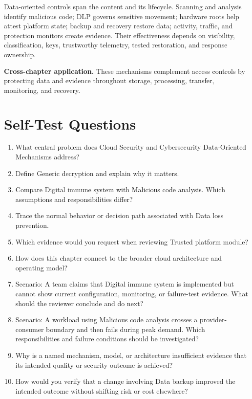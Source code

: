\documentclass[11pt]{article}
\begin{document}
\begin{synthesisbox}
Data-oriented controls span the content and its lifecycle. Scanning and analysis identify malicious code; DLP governs sensitive movement; hardware roots help attest platform state; backup and recovery restore data; activity, traffic, and protection monitors create evidence. Their effectiveness depends on visibility, classification, keys, trustworthy telemetry, tested restoration, and response ownership.
\par\smallskip
\textbf{Cross-chapter application.} These mechanisms complement access controls by protecting data and evidence throughout storage, processing, transfer, monitoring, and recovery.
\end{synthesisbox}
\section{Self-Test Questions}
\begin{enumerate}
\item What central problem does Cloud Security and Cybersecurity Data-Oriented Mechanisms address?
\item Define Generic decryption and explain why it matters.
\item Compare Digital immune system with Malicious code analysis. Which assumptions and responsibilities differ?
\item Trace the normal behavior or decision path associated with Data loss prevention.
\item Which evidence would you request when reviewing Trusted platform module?
\item How does this chapter connect to the broader cloud architecture and operating model?
\item Scenario: A team claims that Digital immune system is implemented but cannot show current configuration, monitoring, or failure-test evidence. What should the reviewer conclude and do next?
\item Scenario: A workload using Malicious code analysis crosses a provider-consumer boundary and then fails during peak demand. Which responsibilities and failure conditions should be investigated?
\item Why is a named mechanism, model, or architecture insufficient evidence that its intended quality or security outcome is achieved?
\item How would you verify that a change involving Data backup improved the intended outcome without shifting risk or cost elsewhere?
\end{enumerate}
\clearpage
\end{document}
